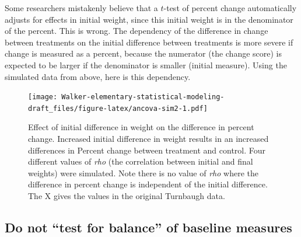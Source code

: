 \documentclass[]{book}
\begin{document}
Some researchers mistakenly believe that a \(t\)-test of percent change automatically adjusts for effects in initial weight, since this initial weight is in the denominator of the percent. This is wrong. The dependency of the difference in change between treatments on the initial difference between treatments is more severe if change is measured as a percent, because the numerator (the change score) is expected to be larger if the denominator is smaller (initial measure). Using the simulated data from above, here is this dependency.

\begin{figure}
\centering
\texttt{[image: Walker-elementary-statistical-modeling-draft\_files/figure-latex/ancova-sim2-1.pdf]}
\caption{\label{fig:ancova-sim2}Effect of initial difference in weight on the difference in percent change. Increased initial difference in weight results in an increased differences in Percent change between treatment and control. Four different values of \emph{rho} (the correlation between initial and final weights) were simulated. Note there is no value of \emph{rho} where the difference in percent change is independent of the initial difference. The X gives the values in the original Turnbaugh data.}
\end{figure}

\hypertarget{do-not-test-for-balance-of-baseline-measures}{%
\subsection{Do not ``test for balance'' of baseline measures}\label{do-not-test-for-balance-of-baseline-measures}}
\end{document}
